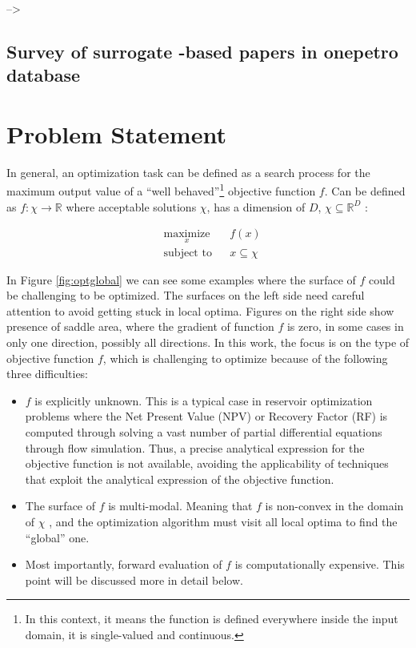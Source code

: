 \documentclass[]{elsarticle} %
\providecommand{\tightlist}{%
  \setlength{\itemsep}{0pt}\setlength{\parskip}{0pt}}
\begin{document}
--\textgreater{}

\hypertarget{survey-of-surrogate--based-papers-in-onepetro-database}{%
\subsection{Survey of surrogate -based papers in onepetro database}\label{survey-of-surrogate--based-papers-in-onepetro-database}}

\newpage

\hypertarget{problem-statement}{%
\section{Problem Statement}\label{problem-statement}}

In general, an optimization task can be defined as a search process for the maximum output value of a ``well behaved''\footnote{In this context, it means the function is defined everywhere inside the input domain, it is single-valued and continuous.} objective function \(f\). Can be defined as \(f: \chi \rightarrow \mathbb{R}\) where acceptable solutions \(\chi\), has a dimension of \(D\), \(\chi \subseteq \mathbb{R}^D\) :

\begin{equation}
\begin{aligned}
& \underset{x}{\text{maximize}}
& & f(x) \\
& \text{subject to}
& & x \subseteq \chi
\end{aligned}
\label{eq:globalopt}
\end{equation}

In Figure \ref{fig:optglobal} we can see some examples where the surface of \(f\) could be challenging to be optimized. The surfaces on the left side need careful attention to avoid getting stuck in local optima. Figures on the right side show presence of saddle area, where the gradient of function \(f\) is zero, in some cases in only one direction, possibly all directions. In this work, the focus is on the type of objective function \(f\), which is challenging to optimize because of the following three difficulties:

\begin{itemize}
\tightlist
\item
  \(f\) is explicitly unknown. This is a typical case in reservoir optimization problems where the Net Present Value (NPV) or Recovery Factor (RF) is computed through solving a vast number of partial differential equations through flow simulation. Thus, a precise analytical expression for the objective function is not available, avoiding the applicability of techniques that exploit the analytical expression of the objective function.
\item
  The surface of \(f\) is multi-modal. Meaning that \(f\) is non-convex in the domain of \(\chi\) , and the optimization algorithm must visit all local optima to find the ``global'' one.
\item
  Most importantly, forward evaluation of \(f\) is computationally expensive. This point will be discussed more in detail below.
\end{itemize}
\end{document}
